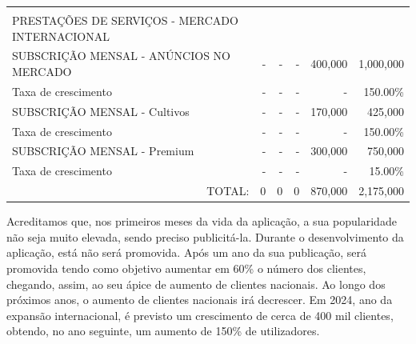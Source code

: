 \documentclass[11pt]{article}
\begin{document}
\begin{adjustbox}{center}
\begin{tabular}{|l|r|r|r|r|r|}
			\multicolumn{1}{l}{} & \multicolumn{1}{l}{} & \multicolumn{1}{l}{} & \multicolumn{1}{l}{} & \multicolumn{1}{l}{} & \multicolumn{1}{l}{} \\
			\multicolumn{1}{l}{PRESTAÇÕES DE SERVIÇOS - MERCADO INTERNACIONAL} & \multicolumn{1}{l}{}& \multicolumn{1}{l}{} & \multicolumn{1}{l}{} & \multicolumn{1}{l}{} & \multicolumn{1}{l}{}\\ \hline
			SUBSCRIÇÃO MENSAL - ANÚNCIOS NO MERCADO        & -                   & -                  & -                & 400,000                &               1,000,000           \\ \hline
			Taxa de crescimento                            &              -            &            -              & -                 & -                  &      150.00\%                    \\ \hline
			SUBSCRIÇÃO MENSAL - Cultivos                   & -                        & -                  & -                  & 170,000                 &        425,000                  \\ \hline
			Taxa de crescimento                            &            -              &                -          & -                & -                 &     150.00\%                     \\ \hline
			SUBSCRIÇÃO MENSAL - Premium                    & -                        & -                 & -                  & 300,000               &      750,000                    \\ \hline
			Taxa de crescimento                            &                   -       &               -           & -                & -                 &  15.00\%                        \\ \hline
			\multicolumn{1}{r}{TOTAL:} & \multicolumn{1}{r}{0} & \multicolumn{1}{r}{0} & \multicolumn{1}{r}{0} & \multicolumn{1}{r}{870,000} & \multicolumn{1}{r}{2,175,000}                   
		\end{tabular}
	\end{adjustbox}

	\vspace{1cm}

	Acreditamos que, nos primeiros meses da vida da aplicação, a sua popularidade não seja muito elevada, sendo preciso publicitá-la. Durante o desenvolvimento da aplicação, está não será promovida. Após um ano da sua publicação, será promovida tendo como objetivo aumentar em 60\% o número dos clientes, chegando, assim, ao seu ápice de aumento de clientes nacionais. Ao longo dos próximos anos, o aumento de clientes nacionais irá decrescer. Em 2024, ano da expansão internacional, é previsto um crescimento de cerca de 400 mil clientes, obtendo, no ano seguinte, um aumento de 150\% de utilizadores.
\end{document}
